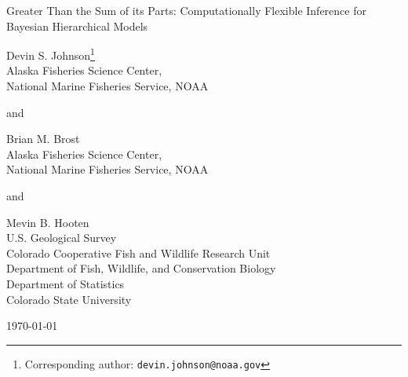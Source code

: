 \documentclass[12pt]{article}
\begin{document}

\vspace*{\fill}

\begin{center}
\setlength{\parindent}{0pt}
\renewcommand{\baselinestretch}{1.8}\normalsize

{\Large Greater Than the Sum of its Parts: Computationally Flexible Inference for Bayesian Hierarchical Models}

\renewcommand{\baselinestretch}{1.15}\normalsize 
\bigskip\bigskip

Devin S. Johnson\footnote{Corresponding author: {\tt devin.johnson@noaa.gov}}\\ 
Alaska Fisheries Science Center,\\
National Marine Fisheries Service, NOAA \medskip

and\medskip

Brian M. Brost\\
Alaska Fisheries Science Center,\\
National Marine Fisheries Service, NOAA \medskip

and\medskip

Mevin B. Hooten \\
U.S. Geological Survey\\
Colorado Cooperative Fish and Wildlife Research Unit\\
Department of Fish, Wildlife, and Conservation Biology\\
Department of Statistics\\
Colorado State University

\bigskip\bigskip

\today

\end{center}

\vspace*{\fill}

\clearpage


\end{document}
